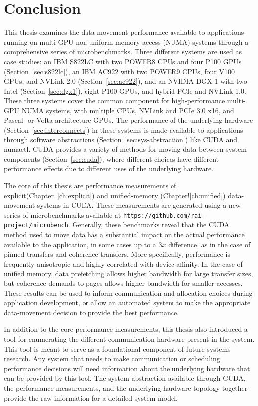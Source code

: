 \chapter{Conclusion}
\label{ch:conclusion}

This thesis examines the data-movement performance available to applications running on multi-GPU non-uniform memory access (NUMA) systems through a comprehensive series of microbenchmarks.
Three different systems are used as case studies: an IBM S822LC with two POWER8 CPUs and four P100 GPUs (Section~\ref{sec:s822lc}), an IBM AC922 with two POWER9 CPUs, four V100 GPUs, and NVLink 2.0 (Section~\ref{sec:ac922}), and an NVIDIA DGX-1 with two Intel (Section~\ref{sec:dgx1}), eight P100 GPUs, and hybrid PCIe and NVLink 1.0.
These three systems cover the common component for high-performance multi-GPU NUMA systems, with multiple CPUs, NVLink and PCIe 3.0 x16, and Pascal- or Volta-architecture GPUs.
The performance of the underlying hardware (Section~\ref{sec:interconnects}) in these systems is made available to applications through software abstractions (Section~\ref{sec:sys-abstraction}) like CUDA and numactl.
CUDA provides a variety of methods for moving data between system components (Section~\ref{sec:cuda}), where different choices have different performance effects due to different uses of the underlying hardware.

The core of this thesis are performance measurements of explicit(Chapter~\ref{ch:explicit}) and unified-memory (Chapter!\ref{ch:unified}) data-movement systems in CUDA.
These measurements are generated using a new series of microbenchmarks available at \texttt{https://github.com/rai-project/microbench}.
Generally, these benchmarks reveal that the CUDA method used to move data has a substantial impact on the actual performance available to the application, in some cases up to a $3x$ difference, as in the case of pinned transfers and coherence transfers.
More specifically, performance is frequently anisotropic and highly correlated with device affinity.
In the case of unified memory, data prefetching allows higher bandwidth for large transfer sizes, but coherence demands to pages allows higher bandwidth for smaller accesses.
These results can be used to inform communication and allocation choices during application development, or allow an automated system to make the appropriate data-movement decision to provide the best performance.

In addition to the core performance measurements, this thesis also introduced a tool for enumerating the different communication hardware present in the system.
This tool is meant to serve as a foundational component of future systems research.
Any system that needs to make communication or scheduling performance decisions will need information about the underlying hardware that can be provided by this tool.
The system abstraction available through CUDA, the performance measurements, and the underlying hardware topology together provide the raw information for a detailed system model.

